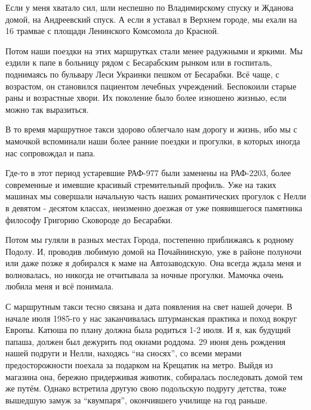 Если у меня хватало сил, шли неспешно по Владимирскому спуску и Жданова домой,
на Андреевский спуск. А если я уставал в Верхнем городе, мы ехали на 16 трамвае
с площади Ленинского Комсомола до Красной. 


\begin{multicols}{2} %
\setlength{\parindent}{0pt}


\end{multicols} %

Потом наши поездки на этих маршрутках стали менее радужными и яркими. Мы ездили
к папе в больницу рядом с Бесарабским рынком или в госпиталь, поднимаясь по
бульвару Леси Украинки пешком от Бесарабки. Всё чаще, с возрастом, он
становился пациентом лечебных учреждений. Беспокоили старые раны и возрастные
хвори. Их поколение было более изношено жизнью, если можно так выразиться. 

В то время маршрутное такси здорово облегчало нам дорогу и жизнь, ибо мы с
мамочкой вспоминали наши более ранние поездки и прогулки, в которых иногда нас
сопровождал и папа. 

Где-то в этот период устаревшие РАФ-977 были заменены на РАФ-2203, более
современные и имевшие красивый стремительный профиль. Уже на таких машинах мы
совершали начальную часть наших романтических прогулок с Нелли в девятом -
десятом классах, неизменно доезжая от уже появившегося памятника философу
Григорию Сковороде до Бесарабки. 

Потом мы
гуляли в разных местах Города, постепенно приближаясь к родному Подолу. И,
проводив любимую домой на Почайнинскую, уже в районе полуночи или даже позже я
добирался к маме на Автозаводскую. Она всегда ждала меня и волновалась, но
никогда не отчитывала за ночные прогулки. Мамочка очень любила меня и всё
понимала. 

С маршрутным такси тесно связана и дата появления на свет нашей
дочери. В начале июля 1985-го у нас заканчивалась штурманская практика и поход
вокруг Европы. Катюша по плану должна была родиться 1-2 июля. И я, как будущий
папаша, должен был дежурить под окнами роддома. 29 июня день рождения нашей
подруги и Нелли, находясь \enquote{на сносях}, со всеми мерами предосторожности поехала
за подарком на Крещатик на метро. Выйдя из магазина она, бережно придерживая
животик, собиралась последовать домой тем же путём. Однако встретила другую
свою подольскую подругу детства, тоже вышедшую замуж за \enquote{квумпаря}, окончившего
училище на год раньше. 

